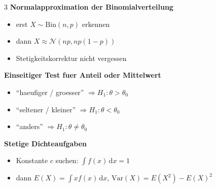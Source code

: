 \documentclass[a4paper,8pt,landscape]{article}
\newcommand{\dd}{\,\mathrm{d}}
\newcommand{\Var}{\mathrm{Var}}
\newcommand{\Bin}{\mathrm{Bin}}
\newcommand{\Normal}{\mathcal{N}}
\begin{document}
\begin{multicols*}{3}
\textbf{Normalapproximation der Binomialverteilung}
\begin{itemize}
  \item erst $X\sim\Bin(n,p)$ erkennen
  \item dann $X\approx \Normal(np,np(1-p))$
  \item Stetigkeitskorrektur nicht vergessen
\end{itemize}

\textbf{Einseitiger Test fuer Anteil oder Mittelwert}
\begin{itemize}
  \item ``haeufiger / groesser'' $\Rightarrow H_1:\theta>\theta_0$
  \item ``seltener / kleiner'' $\Rightarrow H_1:\theta<\theta_0$
  \item ``anders'' $\Rightarrow H_1:\theta\neq\theta_0$
\end{itemize}

\textbf{Stetige Dichteaufgaben}
\begin{itemize}
  \item Konstante $c$ suchen: $\int f(x)\dd x=1$
  \item dann $E(X)=\int x f(x)\dd x$, $\Var(X)=E(X^2)-E(X)^2$
\end{itemize}


\end{multicols*}
\end{document}
